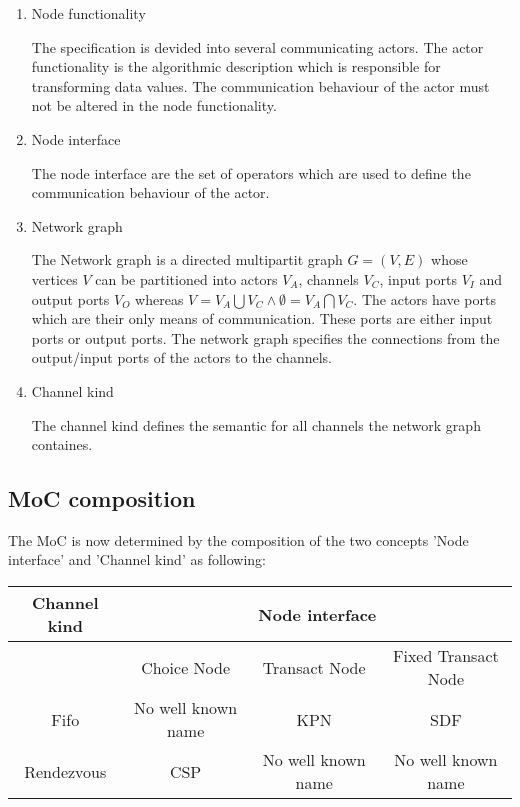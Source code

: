 \begin{enumerate}
\item Node functionality

The specification is devided into several communicating actors.
The actor functionality is the algorithmic description
which is responsible for transforming data values. The communication
behaviour of the actor must not be altered in the node functionality.

\item Node interface

The node interface are the set of operators which are used to
define the communication behaviour of the actor.

\item Network graph

The Network graph is a directed multipartit graph $G=(V,E)$ whose vertices $V$
can be partitioned into actors $V_{A}$, channels $V_{C}$, input ports $V_{I}$ and output
ports $V_{O}$
whereas $V=V_{A} \bigcup V_{C} \wedge \emptyset=V_{A}\bigcap{}V_{C}$.
The actors have ports which are their only means of communication.
These ports are either input ports or output ports.
The network graph specifies the connections from
the output/input ports of the actors to the channels.

\item
Channel kind

The channel kind defines the semantic for all channels
the network graph containes.
\end{enumerate}

\subsection{MoC composition}

The MoC is now determined by the composition of the two concepts 'Node interface'
and 'Channel kind' as following:

\begin{tabular}{|c||c|c|c|}
\hline
 Channel kind & \multicolumn{3}{c|}{ Node interface } \\
\hline
              & Choice Node         & Transact Node      & Fixed Transact Node \\
\hline \hline
 Fifo         & No well known name  & KPN                & SDF \\
\hline
 Rendezvous   & CSP                 & No well known name & No well known name \\
\hline
\end{tabular}

